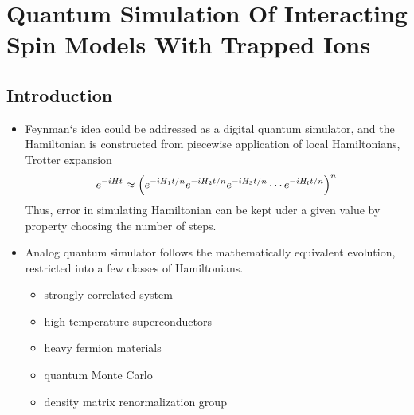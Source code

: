 \section{Quantum Simulation Of Interacting Spin Models With Trapped Ions} %
\label{sec:quantum_simulation_of_interacting_spin_models_with_trapped_ions}

\subsection{Introduction} %
\label{sub:introduction}


\begin{itemize}
\item
Feynman`s idea could be addressed as a digital quantum simulator, and the Hamiltonian is constructed from piecewise application of local Hamiltonians, Trotter expansion
\begin{equation}\label{eq:trotter}
    e^{-iHt}\approx \qty(e^{-iH_1t/n}e^{-iH_2t/n}e^{-iH_3t/n}\cdots e^{-iH_lt/n})^n
\end{equation}
Thus, error in simulating Hamiltonian can be kept uder a given value by property choosing the number of steps.

\item
Analog quantum simulator follows the mathematically equivalent evolution, restricted into a few classes of Hamiltonians.
\begin{itemize}
    \item strongly correlated system
    \item high temperature superconductors
    \item heavy fermion materials
    \item quantum Monte Carlo
    \item density matrix renormalization group
\end{itemize}
\end{itemize}

